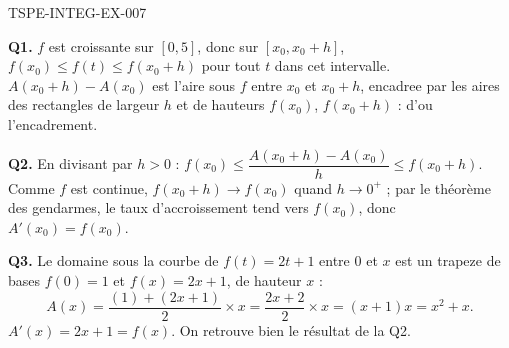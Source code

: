 \begin{corrige}{TSPE-INTEG-EX-007}

\textbf{Q1.} $f$ est croissante sur $[0,5]$, donc sur $[x_0,x_0+h]$, $f(x_0) \leq f(t) \leq f(x_0+h)$ pour tout $t$ dans cet intervalle. $A(x_0+h)-A(x_0)$ est l'aire sous $f$ entre $x_0$ et $x_0+h$, encadree par les aires des rectangles de largeur $h$ et de hauteurs $f(x_0)$, $f(x_0+h)$ : d'ou l'encadrement.

\textbf{Q2.} En divisant par $h>0$ : $f(x_0) \leq \dfrac{A(x_0+h)-A(x_0)}{h} \leq f(x_0+h)$. Comme $f$ est continue, $f(x_0+h) \to f(x_0)$ quand $h \to 0^+$ ; par le théorème des gendarmes, le taux d'accroissement tend vers $f(x_0)$, donc $A'(x_0)=f(x_0)$.

\textbf{Q3.} Le domaine sous la courbe de $f(t)=2t+1$ entre $0$ et $x$ est un trapeze de bases $f(0)=1$ et $f(x)=2x+1$, de hauteur $x$ :
\[
  A(x) = \frac{(1)+(2x+1)}{2} \times x = \frac{2x+2}{2}\times x = (x+1)x = x^2+x.
\]
$A'(x) = 2x+1 = f(x)$. On retrouve bien le résultat de la Q2.

\end{corrige}
